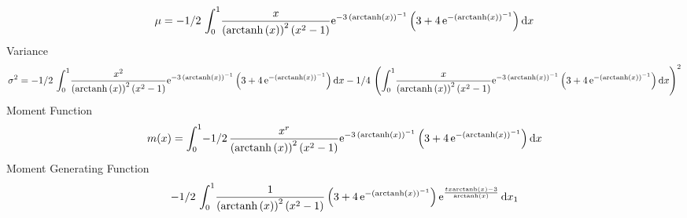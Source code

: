 \documentclass[12pt]{article}
\begin{document}
 $$ \mu=-1/2\,\int_{0}^{1}\!{\frac {x}{ \left( {\rm arctanh} \left(x\right)
 \right) ^{2} \left( {x}^{2}-1 \right) }{{\rm e}^{-3\, \left( 
{\rm arctanh} \left(x\right) \right) ^{-1}}} \left( 3+4\,{{\rm e}^{-
 \left( {\rm arctanh} \left(x\right) \right) ^{-1}}} \right) }
\,{\rm d}x
$$ Variance 
 $$ \sigma^2 = -1/2\,\int_{0}^{1}\!{\frac {{x}^{2}}{ \left( {\rm arctanh} \left(x
\right) \right) ^{2} \left( {x}^{2}-1 \right) }{{\rm e}^{-3\, \left( 
{\rm arctanh} \left(x\right) \right) ^{-1}}} \left( 3+4\,{{\rm e}^{-
 \left( {\rm arctanh} \left(x\right) \right) ^{-1}}} \right) }
\,{\rm d}x-1/4\, \left( \int_{0}^{1}\!{\frac {x}{ \left( {\rm arctanh}
 \left(x\right) \right) ^{2} \left( {x}^{2}-1 \right) }{{\rm e}^{-3\,
 \left( {\rm arctanh} \left(x\right) \right) ^{-1}}} \left( 3+4\,{
{\rm e}^{- \left( {\rm arctanh} \left(x\right) \right) ^{-1}}}
 \right) }\,{\rm d}x \right) ^{2}
$$Moment Function 
 $$ m(x) = \int_{0}^{1}\!-1/2\,{\frac {{x}^{r}}{ \left( {\rm arctanh} \left(x
\right) \right) ^{2} \left( {x}^{2}-1 \right) }{{\rm e}^{-3\, \left( 
{\rm arctanh} \left(x\right) \right) ^{-1}}} \left( 3+4\,{{\rm e}^{-
 \left( {\rm arctanh} \left(x\right) \right) ^{-1}}} \right) }
\,{\rm d}x
$$ Moment Generating Function 
 $$-1/2\,\int_{0}^{1}\!{\frac {1}{ \left( {\rm arctanh} \left(x\right)
 \right) ^{2} \left( {x}^{2}-1 \right) } \left( 3+4\,{{\rm e}^{-
 \left( {\rm arctanh} \left(x\right) \right) ^{-1}}} \right) {{\rm e}^
{{\frac {tx{\rm arctanh} \left(x\right)-3}{{\rm arctanh} \left(x
\right)}}}}}\,{\rm d}x_{{1}}
$$
\end{document}
